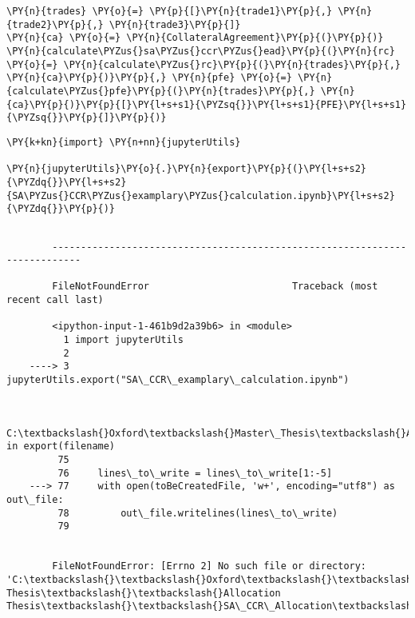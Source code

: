     \begin{tcolorbox}[breakable, size=fbox, boxrule=1pt, pad at break*=1mm,colback=cellbackground, colframe=cellborder]
\begin{Verbatim}[commandchars=\\\{\}]
\PY{n}{trades} \PY{o}{=} \PY{p}{[}\PY{n}{trade1}\PY{p}{,} \PY{n}{trade2}\PY{p}{,} \PY{n}{trade3}\PY{p}{]}
\PY{n}{ca} \PY{o}{=} \PY{n}{CollateralAgreement}\PY{p}{(}\PY{p}{)}
\PY{n}{calculate\PYZus{}sa\PYZus{}ccr\PYZus{}ead}\PY{p}{(}\PY{n}{rc} \PY{o}{=} \PY{n}{calculate\PYZus{}rc}\PY{p}{(}\PY{n}{trades}\PY{p}{,} \PY{n}{ca}\PY{p}{)}\PY{p}{,} \PY{n}{pfe} \PY{o}{=} \PY{n}{calculate\PYZus{}pfe}\PY{p}{(}\PY{n}{trades}\PY{p}{,} \PY{n}{ca}\PY{p}{)}\PY{p}{[}\PY{l+s+s1}{\PYZsq{}}\PY{l+s+s1}{PFE}\PY{l+s+s1}{\PYZsq{}}\PY{p}{]}\PY{p}{)}
\end{Verbatim}
\end{tcolorbox}

    \begin{tcolorbox}[breakable, size=fbox, boxrule=1pt, pad at break*=1mm,colback=cellbackground, colframe=cellborder]
\begin{Verbatim}[commandchars=\\\{\}]
\PY{k+kn}{import} \PY{n+nn}{jupyterUtils}

\PY{n}{jupyterUtils}\PY{o}{.}\PY{n}{export}\PY{p}{(}\PY{l+s+s2}{\PYZdq{}}\PY{l+s+s2}{SA\PYZus{}CCR\PYZus{}examplary\PYZus{}calculation.ipynb}\PY{l+s+s2}{\PYZdq{}}\PY{p}{)}
\end{Verbatim}
\end{tcolorbox}

    \begin{Verbatim}[commandchars=\\\{\}]

        ---------------------------------------------------------------------------

        FileNotFoundError                         Traceback (most recent call last)

        <ipython-input-1-461b9d2a39b6> in <module>
          1 import jupyterUtils
          2 
    ----> 3 jupyterUtils.export("SA\_CCR\_examplary\_calculation.ipynb")
    

        C:\textbackslash{}Oxford\textbackslash{}Master\_Thesis\textbackslash{}Allocation\_Thesis\textbackslash{}SA\_CCR\_Allocation\textbackslash{}analysis\textbackslash{}jupyterUtils.py in export(filename)
         75 
         76     lines\_to\_write = lines\_to\_write[1:-5]
    ---> 77     with open(toBeCreatedFile, 'w+', encoding="utf8") as out\_file:
         78         out\_file.writelines(lines\_to\_write)
         79 
    

        FileNotFoundError: [Errno 2] No such file or directory: 'C:\textbackslash{}\textbackslash{}Oxford\textbackslash{}\textbackslash{}Master Thesis\textbackslash{}\textbackslash{}Allocation Thesis\textbackslash{}\textbackslash{}SA\_CCR\_Allocation\textbackslash{}\textbackslash{}LaTeX\textbackslash{}\textbackslash{}JupyterNotebooksCore\textbackslash{}\textbackslash{}SA\_CCR\_examplary\_calculation.tex'

    \end{Verbatim}


